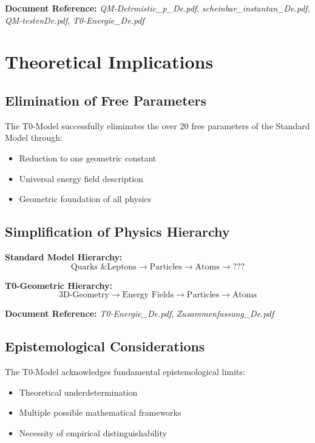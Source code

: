 \documentclass[12pt,a4paper]{article}
\begin{document}
	\textbf{Document Reference:} \textit{QM-Detrmistic\_p\_De.pdf}, \textit{scheinbar\_instantan\_De.pdf}, \textit{QM-testenDe.pdf}, \textit{T0-Energie\_De.pdf}
	
	\section{Theoretical Implications}
	
	\subsection{Elimination of Free Parameters}
	
	The T0-Model successfully eliminates the over 20 free parameters of the Standard Model through:
	
	\begin{itemize}
		\item Reduction to one geometric constant
		\item Universal energy field description
		\item Geometric foundation of all physics
	\end{itemize}
	
	\subsection{Simplification of Physics Hierarchy}
	
	\textbf{Standard Model Hierarchy:}
	\begin{equation}
		\text{Quarks \& Leptons} \rightarrow \text{Particles} \rightarrow \text{Atoms} \rightarrow \text{???}
	\end{equation}
	
	\textbf{T0-Geometric Hierarchy:}
	\begin{equation}
		\text{3D-Geometry} \rightarrow \text{Energy Fields} \rightarrow \text{Particles} \rightarrow \text{Atoms}
	\end{equation}
	
	\textbf{Document Reference:} \textit{T0-Energie\_De.pdf}, \textit{Zusammenfassung\_De.pdf}
	
	\subsection{Epistemological Considerations}
	
	The T0-Model acknowledges fundamental epistemological limits:
	\begin{itemize}
		\item Theoretical underdetermination
		\item Multiple possible mathematical frameworks
		\item Necessity of empirical distinguishability
	\end{itemize}
	
\end{document}
